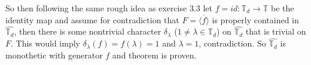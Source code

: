 \documentclass{article}
\begin{document}
\vspace{0.3cm}

So then following the same rough idea as exercise 3.3 let $f = id: \mathbb T_d \rightarrow \mathbb T$ be the identity map and assume for contradiction that $F =\overline{\langle f\rangle}$ is properly contained in $\widehat{\mathbb T_d}$, then there is some nontrivial character $\delta_\lambda$ ($1 \neq \lambda \in \mathbb T_d$) on $\widehat{\mathbb T_d}$ that is trivial on $F$. This would imply $\delta_\lambda(f) =f(\lambda) = 1$ and $\lambda = 1$, contradiction. So $\widehat{\mathbb T_d}$ is monothetic with generator $f$ and theorem is proven.
\end{document}

